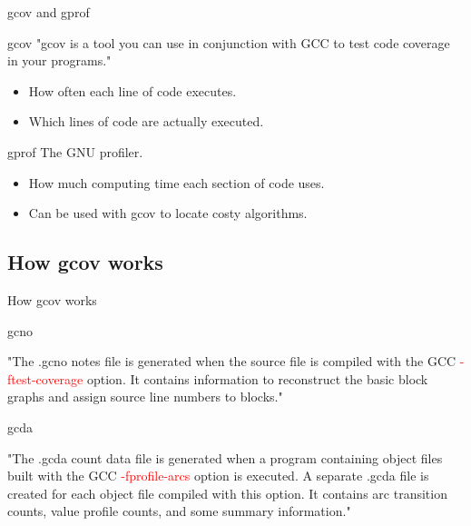 \documentclass{beamer}
\begin{document}
\begin{frame}{gcov and gprof}

\begin{block}{gcov}
\small
"gcov is a tool you can use in conjunction with GCC to test code coverage in your programs." \cite{gcov}

\begin{itemize}
  \item How often each line of code executes.
  \item Which lines of code are actually executed.
\end{itemize}
\end{block}


\begin{block}{gprof}
\small
The GNU profiler. \cite{gprof}

\begin{itemize}
  \item How much computing time each section of code uses.
  \item Can be used with gcov to locate costy algorithms.
\end{itemize}
\end{block}

\end{frame}



\subsection{How gcov works}

\begin{frame}{How gcov works}

\begin{block}{gcno}
\small

"The .gcno notes file is generated when the source file is compiled with the GCC \textcolor{red}{-ftest-coverage} option. It contains information to reconstruct the basic block graphs and assign source line numbers to blocks."

\end{block}

\begin{block}{gcda}
\small

"The .gcda count data file is generated when a program containing object files built with the GCC \textcolor{red}{-fprofile-arcs} option is executed. A separate .gcda file is created for each object file compiled with this option. It contains arc transition counts, value profile counts, and some summary information."

\end{block}

\end{frame}
\end{document}

